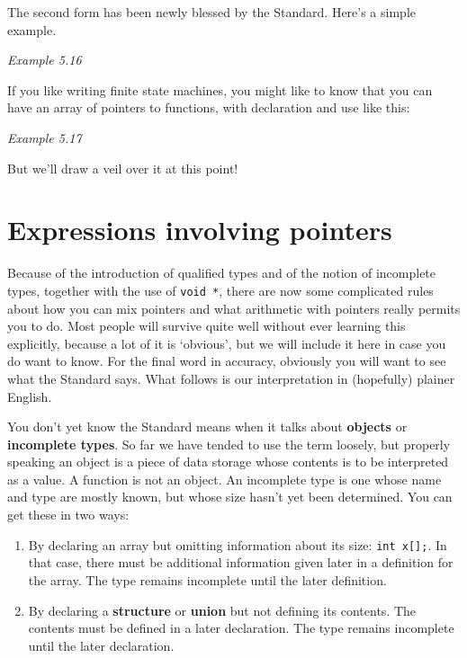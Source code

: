   The second form has been newly blessed by the Standard. Here's a simple
   example.


  \begin{center}\textit{Example 5.16}\end{center}


  If you like writing finite state machines, you might like to know that
   you can have an array of pointers to functions, with declaration and use
   like this:


  \begin{center}\textit{Example 5.17}\end{center}


  But we'll draw a veil over it at this point!


 
        \section{Expressions involving pointers}
        

  

  Because of the introduction of qualified types and of the notion of
   incomplete types, together with the use of \texttt{void *}, there are
   now some complicated rules about how you can mix pointers and what
   arithmetic with pointers really permits you to do. Most people will
   survive quite well without ever learning this explicitly, because a lot
   of it is `obvious', but we will include it here in case you do want
   to know. For the final word in accuracy, obviously you will want to see
   what the Standard says. What follows is our interpretation in (hopefully)
   plainer English.


  You don't yet know the Standard means when it talks about
   \textbf{objects} or \textbf{incomplete types}. So far we have tended
   to use the term loosely, but properly speaking an object is a piece of
   data storage whose contents is to be interpreted as a value. A function
   is not an object. An incomplete type is one whose name and type are
   mostly known, but whose size hasn't yet been determined. You can get
   these in two ways:


  \begin{enumerate}
   \item By declaring an array but omitting information about its size:
    \texttt{int x[];}. In that case, there must be additional
    information given later in a definition for the array. The type remains
    incomplete until the later definition.

   \item By declaring a \textbf{structure} or \textbf{union} but not
    defining its contents.  The contents must be defined in a later
    declaration. The type remains incomplete until the later declaration.
  \end{enumerate}

